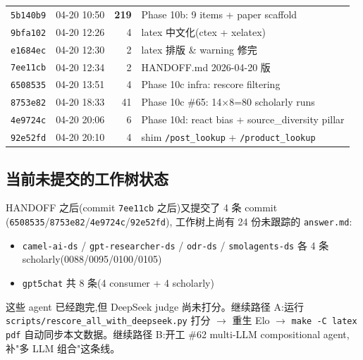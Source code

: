 \documentclass[UTF8,11pt]{ctexart}
\begin{document}
\begin{center}
\begin{tabular}{@{}llrp{7.8cm}@{}}
\texttt{5b140b9} & 04-20 10:50 & \textbf{219} & Phase 10b: 9 items + paper scaffold \\
\texttt{9bfa102} & 04-20 12:26 & 4 & latex 中文化(ctex + xelatex) \\
\texttt{e1684ec} & 04-20 12:30 & 2 & latex 排版 \& warning 修完 \\
\texttt{7ee11cb} & 04-20 12:34 & 2 & HANDOFF.md 2026-04-20 版 \\
\texttt{6508535} & 04-20 13:51 & 4 & Phase 10c infra: rescore filtering \\
\texttt{8753e82} & 04-20 18:33 & 41 & Phase 10c \#65: 14$\times$8=80 scholarly runs \\
\texttt{4e9724c} & 04-20 20:06 & 6 & Phase 10d: react bias + source\_diversity pillar \\
\texttt{92e52fd} & 04-20 20:10 & 4 & shim \texttt{/post\_lookup} + \texttt{/product\_lookup} \\
\bottomrule
\end{tabular}
\end{center}

\subsection{当前未提交的工作树状态}

HANDOFF 之后(commit \texttt{7ee11cb} 之后)又提交了 4 条 commit
(\texttt{6508535}/\texttt{8753e82}/\texttt{4e9724c}/\texttt{92e52fd}),
工作树上尚有 24 份未跟踪的 \texttt{answer.md}:

\begin{itemize}[leftmargin=2em, labelsep=0.5em]
\item \texttt{camel-ai-ds} / \texttt{gpt-researcher-ds} / \texttt{odr-ds}
  / \texttt{smolagents-ds} 各 4 条 scholarly(0088/0095/0100/0105)
\item \texttt{gpt5chat} 共 8 条(4 consumer + 4 scholarly)
\end{itemize}

这些 agent 已经跑完,但 DeepSeek judge 尚未打分。继续路径 A:运行
\texttt{scripts/rescore\_all\_with\_deepseek.py} 打分 $\to$ 重生 Elo
$\to$ \texttt{make -C latex pdf} 自动同步本文数据。继续路径 B:开工
\#62 multi-LLM compositional agent,补"多 LLM 组合"这条线。



\end{document}
